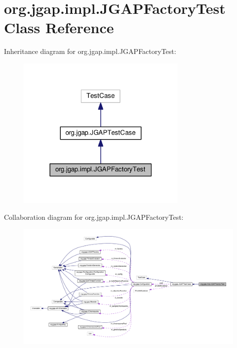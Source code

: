 \hypertarget{classorg_1_1jgap_1_1impl_1_1_j_g_a_p_factory_test}{\section{org.\-jgap.\-impl.\-J\-G\-A\-P\-Factory\-Test Class Reference}
\label{classorg_1_1jgap_1_1impl_1_1_j_g_a_p_factory_test}
}


Inheritance diagram for org.\-jgap.\-impl.\-J\-G\-A\-P\-Factory\-Test\-:
\nopagebreak
\begin{figure}[H]
\begin{center}
\leavevmode
\includegraphics[width=234pt]{classorg_1_1jgap_1_1impl_1_1_j_g_a_p_factory_test__inherit__graph}
\end{center}
\end{figure}


Collaboration diagram for org.\-jgap.\-impl.\-J\-G\-A\-P\-Factory\-Test\-:
\nopagebreak
\begin{figure}[H]
\begin{center}
\leavevmode
\includegraphics[width=350pt]{classorg_1_1jgap_1_1impl_1_1_j_g_a_p_factory_test__coll__graph}
\end{center}
\end{figure}
